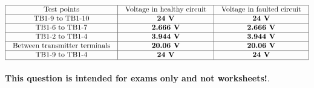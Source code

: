 






$$\vbox{\offinterlineskip
\halign{\strut
\vrule \quad\hfil # \ \hfil & 
\vrule \quad\hfil # \ \hfil & 
\vrule \quad\hfil # \ \hfil \vrule \cr
\noalign{\hrule}
%
Test points & Voltage in healthy circuit & Voltage in faulted circuit \cr
%
\noalign{\hrule}
%
TB1-9 to TB1-10 & {\bf 24 V} & {\bf 24 V} \cr
%
\noalign{\hrule}
%
TB1-6 to TB1-7 & {\bf 2.666 V} & {\bf 2.666 V} \cr
%
\noalign{\hrule}
%
TB1-2 to TB1-4 & {\bf 3.944 V} & {\bf 3.944 V} \cr
%
\noalign{\hrule}
%
Between transmitter terminals & {\bf 20.06 V} & {\bf 20.06 V} \cr
%
\noalign{\hrule}
%
TB1-9 to TB1-4 & {\bf 24 V} & {\bf 24 V} \cr
%
\noalign{\hrule}
} %
}$$ %







{\bf This question is intended for exams only and not worksheets!}.



